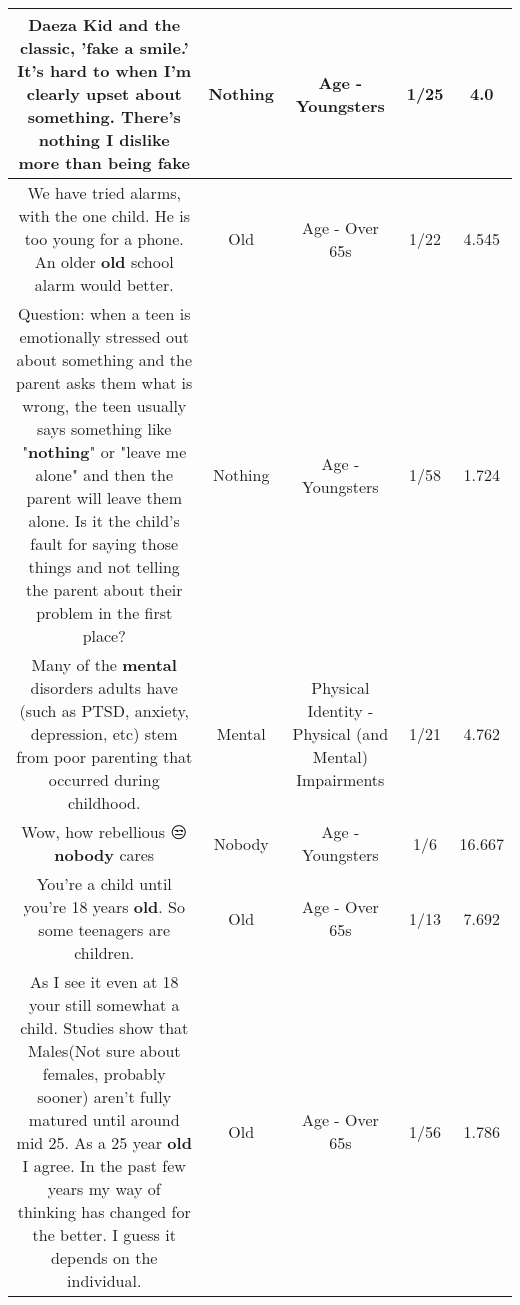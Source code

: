 \documentclass[11pt]{article}
\newlength\mylength
\begin{document}
\begin{center}
\begin{longtable}{|C{.65\mylength}|C{.30\mylength}|C{.12\mylength}|C{.12\mylength}|C{.12\mylength}|}
  \small Daeza Kid and the classic, 'fake a smile.' It's hard to when I'm clearly upset about something. There's \textbf{nothing} I dislike more than being fake\normalsize   & Nothing & Age - Youngsters & 1/25 & 4.0 \\  \hline
  \small We have tried alarms, with the one child. He is too young for a phone. An older \textbf{old} school  alarm would better.\normalsize   & Old & Age - Over 65s & 1/22 & 4.545 \\  \hline
  \small Question: when a teen is emotionally stressed out about something and the parent asks them what is wrong, the teen usually says something like  "\textbf{nothing}" or "leave me alone" and then the parent will leave them alone. Is it the child's fault for saying those things and not telling the parent about their problem in the first place?\normalsize   & Nothing & Age - Youngsters & 1/58 & 1.724 \\  \hline
  \small Many of the \textbf{mental} disorders adults have (such as PTSD, anxiety, depression, etc) stem from poor parenting that occurred during childhood.\normalsize   & Mental & Physical Identity - Physical (and Mental) Impairments & 1/21 & 4.762 \\  \hline
  \small Wow, how rebellious 😒 \textbf{nobody} cares\normalsize   & Nobody & Age - Youngsters & 1/6 & 16.667 \\  \hline
  \small You're a child until you're 18 years \textbf{old}. So some teenagers are children.\normalsize   & Old & Age - Over 65s & 1/13 & 7.692 \\  \hline
  \small As I see it even at 18 your still somewhat a child. Studies show that Males(Not sure about females, probably sooner) aren't fully matured  until around mid 25. As a 25 year \textbf{old} I agree. In the past few years my way of thinking has changed for the better. I guess it depends on the individual.\normalsize   & Old & Age - Over 65s & 1/56 & 1.786 \\  \hline

\end{longtable}
\end{center}
\end{document}
